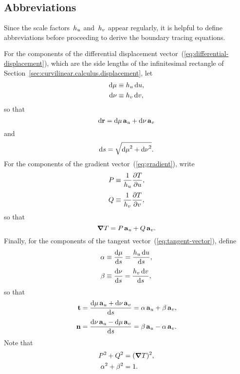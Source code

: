 \subsection{Abbreviations}
\label{sec:curvilinear.calculus.abbreviations}

Since the scale factors~$h_{u}$ and~$h_{v}$ appear regularly,
it is helpful to define abbreviations
before proceeding to derive the boundary tracing equations.

For the components of the differential displacement
vector~(\ref{eq:differential-displacement}),
which are the side lengths of the infinitesimal rectangle
of Section~\ref{sec:curvilinear.calculus.displacement},
let
\begin{align}
  \mathop{}\!\mathrm{d} \mu &\equiv h_{u} \mathop{}\!\mathrm{d} u,
    \label{eq:differential-displacement-u-component} \\
  \mathop{}\!\mathrm{d} \nu &\equiv h_{v} \mathop{}\!\mathrm{d} v,
    \label{eq:differential-displacement-v-component}
\end{align}
so that
\begin{equation}
  \mathop{}\!\mathrm{d} \boldsymbol{\mathrm{r}} = \mathop{}\!\mathrm{d} \mu \mathop{}\!\boldsymbol{\mathrm{a}}_{u} + \mathop{}\!\mathrm{d} \nu \mathop{}\!\boldsymbol{\mathrm{a}}_{v}
  \label{eq:differential-displacement-abbreviated}
\end{equation}
and
\begin{equation}
  \mathop{}\!\mathrm{d} s = \sqrt{{\mathop{}\!\mathrm{d} \mu}^2 + {\mathop{}\!\mathrm{d} \nu}^2}.
  \label{eq:differential-arc-length-abbreviated}
\end{equation}
For the components of the gradient vector~(\ref{eq:gradient}),
write
\begin{align}
  P &\defeq \frac{1}{\scalefac{u}} \pder{T}{u},
    \label{eq:gradient-u-component} \\[\fraclinespace]
  Q &\defeq \frac{1}{\scalefac{v}} \pder{T}{v},
    \label{eq:gradient-v-component}
\end{align}
so that
\begin{equation}
  \mathop{}\!\boldsymbol{\mathrm{\nabla}} T = P \mathop{}\!\boldsymbol{\mathrm{a}}_{u} + Q \mathop{}\!\boldsymbol{\mathrm{a}}_{v}.
  \label{eq:gradient-abbreviated}
\end{equation}
Finally, for the components of
the tangent vector~(\ref{eq:tangent-vector}), define
\begin{align}
  \alpha &\defeq \tder{\mu}{s} = \frac{\scalefac{u} \td u}{\td s},
    \label{eq:tangent-u-component} \\[\fraclinespace]
  \beta &\defeq \tder{\nu}{s} = \frac{\scalefac{v} \td v}{\td s},
    \label{eq:tangent-v-component}
\end{align}
so that
\begin{align}
  \tangentvec
  &= \frac{\td \mu \basisvec{u} + \td \nu \basisvec{v}}{\td s}
  = \alpha \basisvec{u} + \beta \basisvec{v},
    \label{eq:tangent-vector-abbreviated} \\[\fraclinespace]
  \normalvec
  &= \frac{\td \nu \basisvec{u} - \td \mu \basisvec{v}}{\td s}
  = \beta \basisvec{u} - \alpha \basisvec{v}.
    \label{eq:normal-vector-abbreviated}
\end{align}
Note that
\begin{align}
  P^2 + Q^2 &= (\mathop{}\!\boldsymbol{\mathrm{\nabla}} T)^2, \label{eq:gradient-pythagoras} \\
  \alpha^2 + \beta^2 &= 1. \label{eq:tangent-pythagoras}
\end{align}

